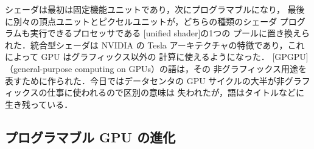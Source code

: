 \documentclass[../main.tex]{subfiles}
\begin{document}
シェーダは最初は固定機能ユニットであり，次にプログラマブルになり，
最後に別々の頂点ユニットとピクセルユニットが，どちらの種類のシェーダ
プログラムも実行できるプロセッサである
[unified shader]の1つの
プールに置き換えられた．統合型シェーダは NVIDIA の Tesla
アーキテクチャの特徴であり，これによって GPU はグラフィックス以外の
計算に使えるようになった．
[GPGPU]（general-purpose computing on GPUs）の語は，その
非グラフィックス用途を表すために作られた．今日ではデータセンタの GPU
サイクルの大半が非グラフィックスの仕事に使われるので区別の意味は
失われたが，語はタイトルなどに生き残っている．

\subsection{プログラマブル GPU の進化}
\end{document}
